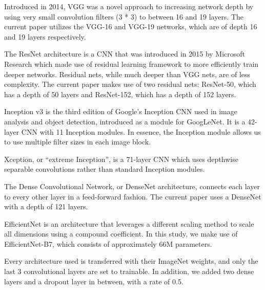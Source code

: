 \documentclass{article}
\begin{document}
\begin{description}[leftmargin=0cm,style=nextline]
    \item[VGG] Introduced in 2014, VGG was a novel approach to increasing network depth by using very small convolution filters (3 * 3) to between 16 and 19 layers. The current paper utilizes the VGG-16 and VGG-19 networks, which are of depth 16 and 19 layers respectively. \cite{b15}
    
    \item[ResNet] The ResNet architecture is a CNN that was introduced in 2015 by Microsoft Research which made use of residual learning framework to more efficiently train deeper networks. Residual nets, while much deeper than VGG nets, are of less complexity. The current paper makes use of two residual nets: ResNet-50, which has a depth of 50 layers and ResNet-152, which has a depth of 152 layers. \cite{b17}
    
    \item[Inception-v3] Inception v3 is the third edition of Google’s Inception CNN used in image analysis and object detection, introduced as a module for GoogLeNet. It is a 42-layer CNN with 11 Inception modules. In essence, the Inception module allows us to use multiple filter sizes in each image block. \cite{b18}
    
    \item[Xception] Xception, or “extreme Inception”, is a 71-layer CNN which uses depthwise separable convolutions rather than standard Inception modules. \cite{b19}
    
    \item[DenseNet] The Dense Convolutional Network, or DenseNet architecture, connects each layer to every other layer in a feed-forward fashion. The current paper uses a DenseNet with a depth of 121 layers. \cite{b20}
    
    \item[EfficientNet] EfficientNet is an architecture that leverages a different scaling method to scale all dimensions using a compound coefficient. In this study, we make use of EfficientNet-B7, which consists of approximately 66M parameters. \cite{b21}
\end{description}

Every architecture used is transferred with their ImageNet weights, and only the last 3 convolutional layers are set to trainable. In addition, we added two dense layers and a dropout layer in between, with a rate of 0.5.
\end{document}
